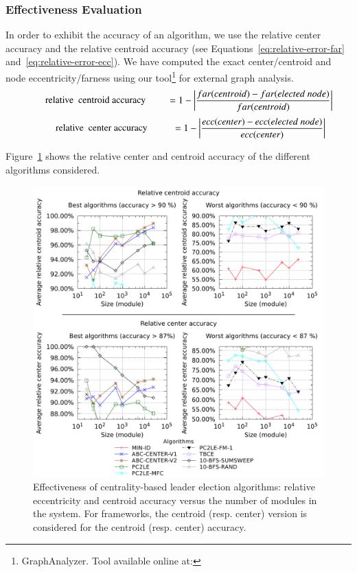 \subsubsection{Effectiveness Evaluation}

In order to exhibit the accuracy of an algorithm, we use the relative center accuracy and the relative centroid accuracy (see Equations~\eqref{eq:relative-error-far} and~\eqref{eq:relative-error-ecc}). We have computed the exact center/centroid and node eccentricity/farness using our tool\footnote{GraphAnalyzer. Tool available online at: \GAURL{}} for external graph analysis.
\vspace{-1em}
\begin{align}
\equationTextSize
\label{eq:relative-error-far}
\parbox{15em}{\centering relative\ \ centroid accuracy}
= 1 - \left|\frac{far(centroid)- far(elected\ node)}{far(centroid)}\right|
\end{align}
\vspace{-1em}
\begin{align}
\equationTextSize
\label{eq:relative-error-ecc}
\parbox{15em}{\centering relative\ \ center accuracy} 
= 1 - \left|\frac{ecc(center)- ecc(elected\ node)}{ecc(center)}\right|
\end{align}

Figure~\ref{fig:centrality:accuracy} shows the relative center and centroid accuracy of the different algorithms considered. 

\begin{figure}[!h]
	\centering
	\includegraphics[width=0.85\linewidth]{images/centrality/accuracy}
	\caption{Effectiveness of centrality-based leader election algorithms: relative eccentricity and centroid accuracy versus the number of modules in the system. For frameworks, the centroid (resp. center) version is considered for the centroid (resp. center) accuracy.}
	\label{fig:centrality:accuracy}
\end{figure}

